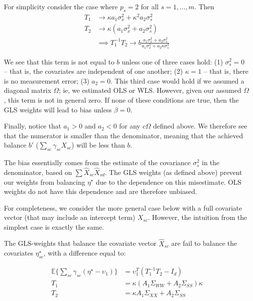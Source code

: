 \begin{remark}
    For simplicity consider the case where $p_s = 2$ for all $s = 1, ..., m$. Then
    \begin{align*}
        T_1 &\to \kappa a_1\sigma^2_x + \kappa^2 a_2\sigma^2_s \\
        T_2 &\to \kappa(a_1 \sigma^2_x + a_2 \sigma^2_s) \\
        &\implies T_1^{-1}T_2 \to b\frac{a_1\sigma^2_x + a_2\sigma^2_s}{a_1\sigma^2_x + a_2\kappa\sigma^2_s}
    \end{align*}
    
    We see that this term is not equal to $b$ unless one of three cases hold: (1) $\sigma^2_s = 0$ -- that is, the covariates are independent of one another; (2) $\kappa = 1$ -- that is, there is no measurement error; (3) $a_2 = 0$. This third case would hold if we assumed a diagonal matrix $\Omega$; ie, we estimated OLS or WLS. However, given our assumed $\Omega$, this term is not in general zero. If none of these conditions are true, then the GLS weights will lead to bias unless $\beta = 0$. 
    
    Finally, notice that $a_1 > 0$ and $a_2 < 0$ for any $c\Omega$ defined above. We therefore see that the numerator is smaller than the denominator, meaning that the achieved balance $b'$ ($\sum_{sc}\gamma_{sc}X_{sc}$) will be less than $b$.
\end{remark}

\begin{remark}
The bias essentially comes from the estimate of the covariance $\sigma^2_s$ in the denominator, based on $\sum \hat{X}_{sc}\hat{X}_{sd}$. The GLS weights (as defined above) prevent our weights from balancing $\eta^\star$ due to the dependence on this misestimate. OLS weights do not have this dependence and are therefore unbiased.
\end{remark}

For completeness, we consider the more general case below with a full covariate vector (that may include an intercept term) $X_{sc}$. However, the intuition from the simplest case is exactly the same.

\begin{proposition}
    The GLS-weights that balance the covariate vector $\hat{X}_{sc}$ are fail to balance the covariates $\eta^\star_{sc}$, with a difference equal to:
    
    \begin{align*}
        \mathbb{E}\{\sum_{sc}\gamma_{sc}(\eta^\star - \upsilon_1)\} &= \upsilon_1^T(T_1^{-1}T_2 - I_d) \\
        T_1 &= \kappa(A_1\Sigma_{WW} + A_2\Sigma_{SS})\kappa \\
        T_2 &= \kappa A_1\Sigma_{XX} + A_2\Sigma_{SS} \\
    \end{align*}
\end{proposition}

